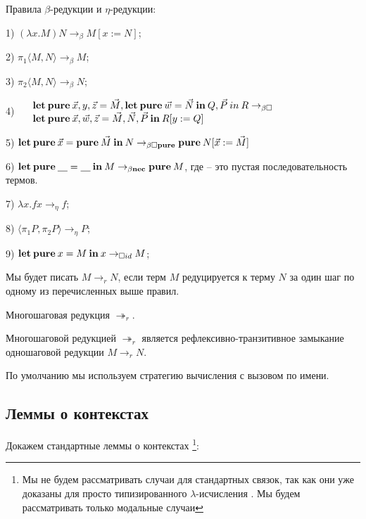 \begin{defin} Правила $\beta$-редукции и $\eta$-редукции:

1) $(\lambda x. M) N \rightarrow_{\beta} M [x := N]$;

2) $\pi_1 \langle M, N \rangle \rightarrow_{\beta} M$;

3) $\pi_2 \langle M, N \rangle \rightarrow_{\beta} N$;

4) $\begin{array}{lll}
& {\bf let \: pure \:} \vec{x}, y, \vec{z} = \vec{M}, {\bf let \: pure \: } \vec{w} = \vec{N} {\: \bf in \: } Q, \vec{P} {\: in \:} R \rightarrow_{\beta \Box} & \\
& {\bf let \: pure \:} \vec{x}, \vec{w}, \vec{z} = \vec{M}, \vec{N}, \vec{P} {\: \bf in \: } R [y := Q]
\end{array}$

5) ${\bf let \: pure \:} \vec{x} = {\bf pure \:} \vec{M} {\: \bf in \:} N \rightarrow_{\beta \Box {\bf pure}} {\bf pure \:} N [\vec{x} := \vec{M}]$

6) ${\bf let \: pure \:} \underline{\quad} = \underline{\quad} {\: \bf in \:} M \rightarrow_{\beta {\bf nec}} {\bf pure \:} M$, где \underline{\quad} -- это пустая последовательность термов.

7) $\lambda x. f x \rightarrow_{\eta} f$;

8) $\langle \pi_1 P, \pi_2 P \rangle \rightarrow_{\eta} P$;

9) ${\bf let \: pure \:} x = M {\: \bf in \: } x \rightarrow_{\Box id} M$;

\end{defin}

Мы будет писать $M \rightarrow_{r} N$, если терм $M$ редуцируется к терму $N$ за один шаг по одному из перечисленных выше правил.

\begin{defin} Многошаговая редукция $\twoheadrightarrow_{r}$.

  Многошаговой редукцией $\twoheadrightarrow_{r}$ является рефлексивно-транзитивное замыкание одношаговой редукции $M \rightarrow_{r} N$.
\end{defin}

По умолчанию мы используем стратегию вычисления с вызовом по имени.

\subsection{Леммы о контекстах}

Докажем стандартные леммы о контекстах \footnote{Мы не будем рассматривать случаи для стандартных связок, так как они уже доказаны для просто типизированного $\lambda$-исчисления \cite{Neder} \cite{Morten}. Мы будем рассматривать только модальные случаи}:

